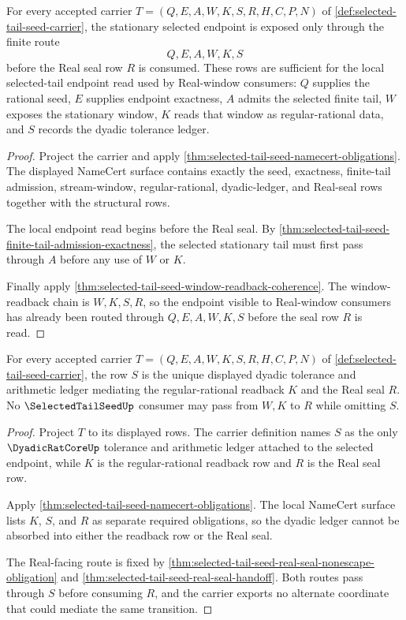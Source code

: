 \begin{theorem}
\label{thm:selected-tail-seed-stationary-endpoint-coverage}
For every accepted carrier $T=(Q,E,A,W,K,S,R,H,C,P,N)$ of \autoref{def:selected-tail-seed-carrier}, the stationary selected endpoint is exposed only through the finite route
$$
Q,E,A,W,K,S
$$
before the Real seal row $R$ is consumed. These rows are sufficient for the local selected-tail endpoint read used by Real-window consumers: $Q$ supplies the rational seed, $E$ supplies endpoint exactness, $A$ admits the selected finite tail, $W$ exposes the stationary window, $K$ reads that window as regular-rational data, and $S$ records the dyadic tolerance ledger.
\end{theorem}
\begin{proof}
Project the carrier and apply \autoref{thm:selected-tail-seed-namecert-obligations}. The displayed NameCert surface contains exactly the seed, exactness, finite-tail admission, stream-window, regular-rational, dyadic-ledger, and Real-seal rows together with the structural rows.

The local endpoint read begins before the Real seal. By \autoref{thm:selected-tail-seed-finite-tail-admission-exactness}, the selected stationary tail must first pass through $A$ before any use of $W$ or $K$.

Finally apply \autoref{thm:selected-tail-seed-window-readback-coherence}. The window-readback chain is $W,K,S,R$, so the endpoint visible to Real-window consumers has already been routed through $Q,E,A,W,K,S$ before the seal row $R$ is read.
\end{proof}

\begin{theorem}
\label{thm:selected-tail-seed-dyadic-ledger-readback-coverage}
For every accepted carrier $T=(Q,E,A,W,K,S,R,H,C,P,N)$ of \autoref{def:selected-tail-seed-carrier}, the row $S$ is the unique displayed dyadic tolerance and arithmetic ledger mediating the regular-rational readback $K$ and the Real seal $R$. No $\SelectedTailSeedUp$ consumer may pass from $W,K$ to $R$ while omitting $S$.
\end{theorem}
\begin{proof}
Project $T$ to its displayed rows. The carrier definition names $S$ as the only $\DyadicRatCoreUp$ tolerance and arithmetic ledger attached to the selected endpoint, while $K$ is the regular-rational readback row and $R$ is the Real seal row.

Apply \autoref{thm:selected-tail-seed-namecert-obligations}. The local NameCert surface lists $K$, $S$, and $R$ as separate required obligations, so the dyadic ledger cannot be absorbed into either the readback row or the Real seal.

The Real-facing route is fixed by \autoref{thm:selected-tail-seed-real-seal-nonescape-obligation} and \autoref{thm:selected-tail-seed-real-seal-handoff}. Both routes pass through $S$ before consuming $R$, and the carrier exports no alternate coordinate that could mediate the same transition.
\end{proof}

